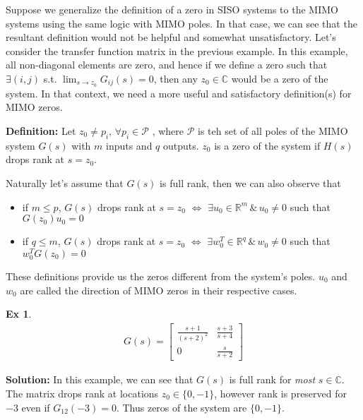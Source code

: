 \documentclass[twoside]{article}
\newtheorem{exmp}[theorem]{Ex}
\begin{document}
Suppose we generalize the definition of a zero in SISO systems to the MIMO systems using the same logic with MIMO poles. In that case, we can see that the resultant definition would not be helpful and somewhat unsatisfactory. Let's consider the transfer function matrix in the previous example. In this example, all non-diagonal elements are zero, and hence if we define a zero such that $\exists (i,j)$ s.t. $\lim_{s \to z_0}G_{ij}(s) = 0$, then any $z_0 \in \mathbb{C}$ would be a zero of the system. In that context, we need a more useful and satisfactory definition(s) for MIMO zeros.

\textbf{Definition:} Let $z_0 \neq p_i , \, \forall p_i \in \mathcal{P}$ , where $\mathcal{P}$ is teh set of all poles of the MIMO system $G(s)$ with $m$ inputs and
$q$ outputs. $z_0$ is a zero of the system if $H(s)$ drops rank at $s = z_0$.

Naturally let's assume that $G(s)$ is full rank, then we can also observe that
\begin{itemize}
\item if $m \leq p$, $G(s)$ drops rank at $s = z_0$ $\iff$ $\exists u_0 \in \mathbb{R}^{m} \, \& \, u_0 \neq 0$ such that $G(z_0) u_0 = 0$
\item if $q \leq m$, $G(s)$ drops rank at $s = z_0$ $\iff$ $\exists w_0^T \in \mathbb{R}^{q} \, \& \, w_0 \neq 0$ such that $w_0^T G(z_0) = 0$
\end{itemize}

These definitions provide us the zeros different from the system's poles. $u_0$ and $w_0$ are called the direction of MIMO zeros in their respective cases. 
%
\begin{exmp}
	\begin{align*}
	G(s) = \left[ \begin{array}{ccc} \frac{s+1}{(s+2)^2} & \frac{s+3}{s+4}  \\  
	0 & \frac{s}{s+2}  \end{array} \right]
	\end{align*}
\end{exmp}
%
\textbf{Solution:} In this example, we can see that $G(s)$ is full rank for \textit{most} $s \in \mathbb{C}$. The matrix drops rank at locations
$z_0 \in \lbrace 0 , -1 \rbrace$, however rank is preserved for $-3$ even if $G_{12}(-3) = 0$. Thus zeros of the system 
are $\lbrace 0 , -1 \rbrace$.
\end{document}
